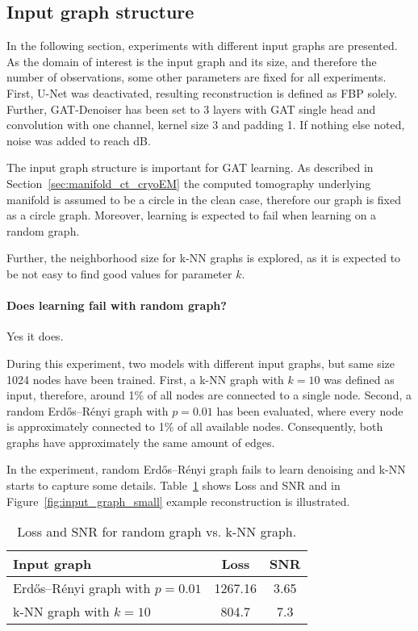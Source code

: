   \subsection{Input graph structure}
  In the following section, experiments with different input graphs are presented.
  As the domain of interest is the input graph and its size, and therefore the number of observations, 
  some other parameters are fixed for all experiments.
  First, U-Net was deactivated, resulting reconstruction is defined as FBP solely.
  Further, GAT-Denoiser has been set to 3 layers with GAT single head and convolution 
  with one channel, kernel size 3 and padding 1. 
  If nothing else noted, noise was added to reach  dB.

  The input graph structure is important for GAT learning. As described in Section~\ref{sec:manifold_ct_cryoEM}
  \textit{} the computed tomography underlying manifold is assumed to be a circle 
  in the clean case, therefore our graph is fixed as a circle graph. 
  Moreover, learning is expected to fail when learning on a random graph.

  Further, the neighborhood size for k-NN graphs is explored, as it is expected to be not easy to find 
  good values for parameter $k$.

  \paragraph{Does learning fail with random graph?}
  Yes it does.

  During this experiment, two models with different input graphs, but same size 1024 nodes have been trained.
  First, a k-NN graph with $k=10$ was defined as input, therefore, around 1\%  of all nodes are connected to a single node.
  Second, a random Erdős–Rényi graph with $p=0.01$ has been evaluated, where every node is 
  approximately connected to 1\% of all available nodes. Consequently, both graphs have approximately the same amount of edges.
  
  In the experiment, random Erdős–Rényi graph fails to learn denoising and k-NN starts to capture some details.
  Table~\ref{tab:input_graph} shows Loss and SNR and in Figure~\ref{fig:input_graph_small} example reconstruction is illustrated.

  \begin{table}[H]
    \centering
      \begin{tabular}{l|cc}
      \toprule
      \textbf{Input graph} & \textbf{Loss} & \textbf{SNR}  \\ 
      \midrule
      Erdős–Rényi graph with $p=0.01$    &  1267.16         &  3.65   \\ \hline
      k-NN graph with $k=10$             &  804.7           &  7.3    \\ \hline
      \midrule
      \end{tabular}
    \caption{Loss and SNR for random graph vs. k-NN graph. }
    \label{tab:input_graph}
  \end{table}
  
